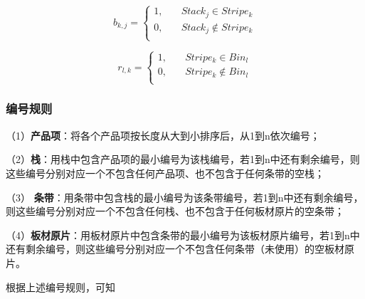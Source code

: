 \documentclass[bwprint]{gmcmthesis}
\begin{document}
\begin{equation}
    b_{k,j}=
    \begin{cases}
        1, \quad  & Stack_j \in  Stripe_k \\
        0,\quad  & Stack_j  \notin  Stripe_k \\
    \end{cases}
\end{equation}

\begin{equation}
    r_{l,k}=
    \begin{cases}
        1, \quad  & Stripe_k \in  Bin_l \\
        0,\quad  & Stripe_k  \notin  Bin_l \\
    \end{cases}
\end{equation}

\subsubsection{编号规则}

（1）\textbf{产品项}：将各个产品项按长度从大到小排序后，从1到n依次编号；

（2）\textbf{栈}：用栈中包含产品项的最小编号为该栈编号，若1到n中还有剩余编号，则这些编号分别对应一个不包含任何产品项、也不包含于任何条带的空栈；

（3） \textbf{条带}：用条带中包含栈的最小编号为该条带编号，若1到n中还有剩余编号，则这些编号分别对应一个不包含任何栈、也不包含于任何板材原片的空条带；

（4）\textbf{板材原片}：用板材原片中包含条带的最小编号为该板材原片编号，若1到n中还有剩余编号，则这些编号分别对应一个不包含任何条带（未使用）的空板材原片。

根据上述编号规则，可知
\end{document}
